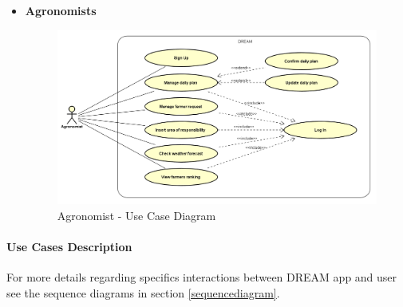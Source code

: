 \documentclass[table, 12pt]{article}
\begin{document}
\begin{itemize}
\begin{center}
\begin{figure}[H]
            \label{fig: UseCase_Farmer}
        \end{figure}
    \end{center}
    \newpage
    \item \textbf {Agronomists}
    \begin{center}
        \begin{figure}[H]
            \includegraphics[scale=0.60, center]{assets/Use cases/UseCase_Agronomist.png}
            \caption{Agronomist - Use Case Diagram}
            \label{fig: UseCase_Agronomist}
        \end{figure}
    \end{center}
    \newpage
\end{itemize}

    \paragraph{Use Cases Description}

    For more details regarding specifics interactions between DREAM app and user see the sequence diagrams in section \ref{sequencediagram}.
    
\end{document}
